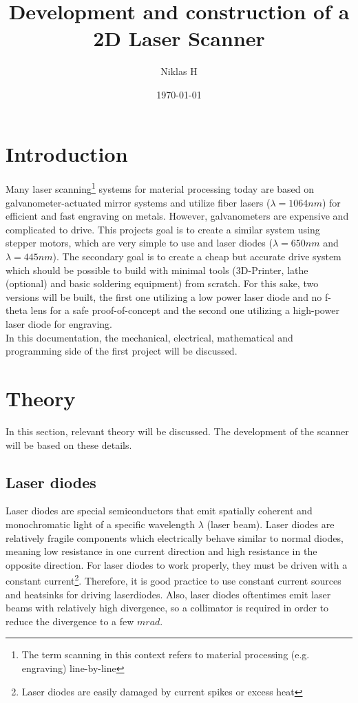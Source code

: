 \documentclass[a4paper, 11pt]{scrartcl}
\title {Development and construction of a 2D Laser Scanner}
\author {Niklas H}
\date {\today}
\begin{document}
\maketitle
\tableofcontents
\newpage
\section{Introduction}
Many laser scanning\footnote{The term scanning in this context refers to material processing (e.g. engraving) line-by-line} systems for material processing today are based on galvanometer-actuated mirror systems and utilize fiber lasers ($\lambda = 1064nm$) for efficient and fast engraving on metals. However, galvanometers are expensive and complicated to drive.  This projects goal is to create a similar system using stepper motors, which are very simple to use and laser diodes ($\lambda=650nm$ and $\lambda=445nm$). The secondary goal is to create a cheap but accurate drive system which should be possible to build with minimal tools (3D-Printer, lathe (optional) and basic soldering equipment) from scratch. For this sake, two versions will be built, the first one utilizing a low power laser diode and no f-theta lens for a safe proof-of-concept and the second one utilizing a high-power laser diode for engraving. \\
In this documentation, the mechanical, electrical, mathematical and programming side of the first project will be discussed.

\section{Theory}
In this section, relevant theory will be discussed. The development of the scanner will be based on these details. \\
\subsection{Laser diodes} 
Laser diodes are special semiconductors that emit spatially coherent and monochromatic light of a specific wavelength $\lambda$ (laser beam). Laser diodes are relatively fragile components which electrically behave similar to normal diodes, meaning low resistance in one current direction and high resistance in the opposite direction. For laser diodes to work properly, they must be driven with a constant current\footnote{Laser diodes are easily damaged by current spikes or excess heat}. Therefore, it is good practice to use constant current sources and heatsinks for driving laserdiodes. Also, laser diodes oftentimes emit laser beams with relatively high divergence, so a collimator is required in order to reduce the divergence to a few $mrad$. 
\end{document}
